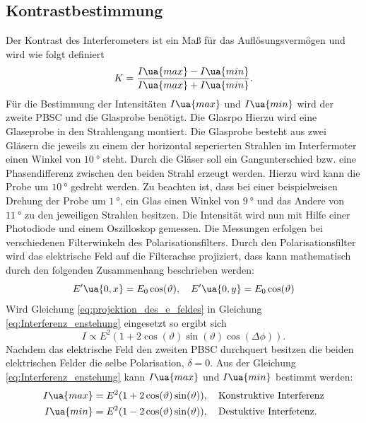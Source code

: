 \subsection{Kontrastbestimmung}\label{sec:Kontrastbestimmung}
Der Kontrast des Interferometers ist ein Maß für das Auflösungsvermögen und wird
wie folgt definiert
\begin{equation}
  \label{eq:kontrast}
  K = \frac{I\ua{max} - I\ua{min}}{I\ua{max}+I\ua{min}}.
\end{equation}
Für die Bestimmung der Intensitäten $I\ua{max}$ und $I\ua{min}$ wird der zweite
PBSC und die Glasprobe benötigt.
Die Glasrpo
Hierzu wird eine Glaseprobe in den Strahlengang montiert. Die Glasprobe
besteht aus zwei Gläsern die jeweils zu einem der horizontal seperierten Strahlen
im Interfermoter einen Winkel von $\SI{10}{\degree}$ steht. Durch die Gläser soll
ein Gangunterschied bzw. eine Phasendifferenz zwischen den beiden Strahl erzeugt werden.
Hierzu wird kann die Probe um $\SI{10}{\degree}$ gedreht werden. Zu beachten ist, dass
bei einer beispielweisen Drehung der Probe um $\SI{1}{\degree}$, ein Glas
einen Winkel von $\SI{9}{\degree}$ und das Andere von $\SI{11}{\degree}$ zu den jeweiligen
Strahlen besitzen. Die Intensität wird nun mit Hilfe einer Photodiode und einem Oszilloskop
gemessen. Die Messungen erfolgen bei verschiedenen Filterwinkeln des Polarisationsfilters.
Durch den Polarisationsfilter wird das elektrische Feld auf die Filterachse projiziert, dass
kann mathematisch durch den folgenden Zusammenhang beschrieben werden:
\begin{equation}
  \label{eq:projektion_des_e_feldes}
  E'\ua{0,x} = E_0 \cos(\vartheta), \quad E'\ua{0,y} = E_0 \cos(\vartheta)
\end{equation}
Wird Gleichung \eqref{eq:projektion_des_e_feldes} in Gleichung \eqref{eq:Interferenz_enstehung}
eingesetzt so ergibt sich
\begin{equation}
  \label{eq:Interferenz}
  I\propto E^2(1+2\cos(\vartheta)\sin(\vartheta)\cos(\Delta\phi)).
\end{equation}
Nachdem das elektrische Feld den zweiten PBSC durchquert besitzen die beiden elektrischen Felder
die selbe Polarisation, $\delta = 0$. Aus der Gleichung \eqref{eq:Interferenz_enstehung}
kann $I\ua{max}$ und $I\ua{min}$ bestimmt werden:
\begin{align}
  \label{eq:I_max_und_I_min}
  \begin{aligned}
  I\ua{max} & = E^2(1+2\cos(\vartheta)\sin(\vartheta)), \quad \text{Konstruktive Interferenz} \\
  I\ua{min} & = E^2(1-2\cos(\vartheta)\sin(\vartheta)), \quad \text{Destuktive Interfetenz}.
\end{aligned}
\end{align}
